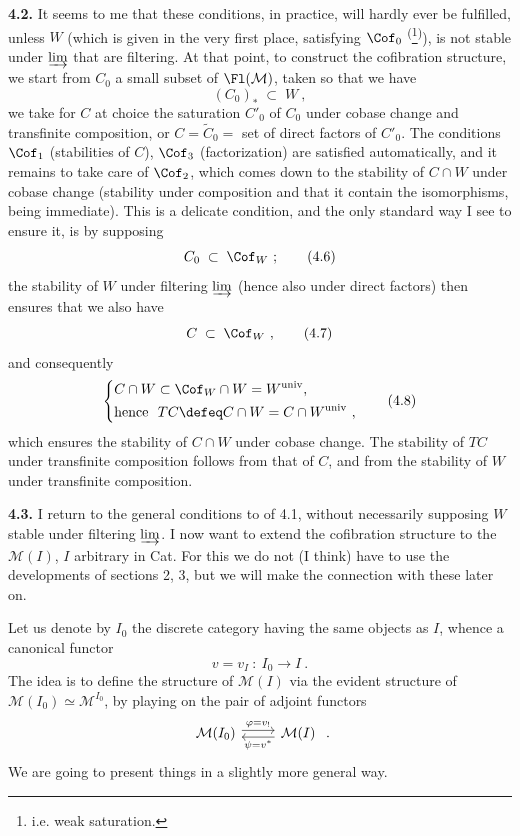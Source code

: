 \textbf{4.2.} It seems to me that these conditions, in practice, will hardly ever be fulfilled, unless $W$ (which is given in the very first place, satisfying $\Cof_0$ \textsuperscript{(}\footnote[18]{i.e. weak saturation.}\textsuperscript{)}), is not stable under $\varinjlim$ that are
filtering. At that point, to construct the cofibration structure, we start from $C_0$ a small subset of $\Fl(\mathcal{M})$, taken so that we have
\[
(C_0)_* \;\subset\; W\ , \tag*{(4.5)}
\]
we take for $C$ at choice the saturation $C'_0$ of $C_0$ under cobase change and transfinite composition, or $C = \tilde{C}_0 =$ set of direct factors of $C'_0$. The conditions $\Cof_1$ (stabilities of $C$), $\Cof_3$ (factorization) are satisfied automatically, and it remains to take care of $\Cof_2$, which comes down to the stability of $C{\cap}W$ under cobase change (stability under composition and that it contain the isomorphisms, being immediate). This is a delicate condition, and the only standard way I see to ensure it, is by supposing
\[
C_0 \;\subset\; \Cof_W\ ; \tag*{(4.6)}
\]
the stability of $W$ under filtering $\varinjlim$ (hence also under direct factors) then ensures that we also have
\[
C \;\subset\; \Cof_W\ , \tag*{(4.7)}
\]
and consequently
\[
\left\{
\begin{aligned}
& C \cap W \subset \Cof_W \cap W = W^{\mathrm{univ}}, \\
& \text{hence }\ TC \defeq C \cap W = C \cap W^{\mathrm{univ}}\ ,
\end{aligned}
\right. \tag*{(4.8)}
\]
which ensures the stability of $C \cap W$ under cobase change. The stability of $TC$ under transfinite composition follows from that of $C$, and from the stability of $W$ under transfinite composition.

\textbf{4.3.} I return to the general conditions to of 4.1, without necessarily supposing $W$ stable under filtering $\varinjlim$. I now want to extend the cofibration structure to the $\mathcal{M}(I)$, $I$ arbitrary in Cat. For this we do not (I think) have to use the developments of sections 2, 3, but we will make the connection with these later on.

Let us denote by $I_0$ the discrete category having the same objects as $I$, whence a canonical functor
\[
v = v_I \ :\ I_0 \longrightarrow I\ . \tag*{(4.9)}
\]
The idea is to define the structure of $\mathcal{M}(I)$ via the evident structure of $\mathcal{M}(I_0) \simeq \mathcal{M}^{I_0}$, by playing on the pair of adjoint functors
\[
\begin{tikzcd}
\mathcal{M}(I_0) \arrow[r, shift left, "\varphi = v_!"] & \mathcal{M}(I) \arrow[l, shift left, "\psi = v^*"]
\end{tikzcd}
\ .
\]
We are going to present things in a slightly more general way.

